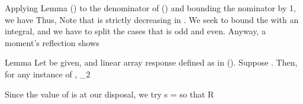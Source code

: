Applying Lemma () to the denominator of () and bounding the nominator by 1, we have
%
%
Thus,
%
%
Note that  is strictly decreasing in .
We seek to bound the  with an integral, and we have to split the cases that  is odd and even.
Anyway, a moment's reflection shows
%



\Result
{Lemma}
{
Let \m {\f } be given, and linear array response  defined as in ().
Suppose .
Then, for any instance of \m {\f},
%
 {
\NC {} _2
\leq \NC {} {\pi {}} \NR
}
}

Since the value of  is at our disposal, we try
%
 {
\NC s
=\NC {} \NR
}
%
so that
%
 {
\NC R
\leq \NC {} {\pi {}} \NR
}

\stopsubsection

\startsubsection [title={Norm of Angular Channel Response}]

